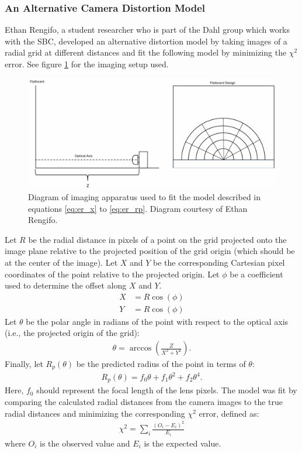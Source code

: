 \documentclass[11pt, letterpaper]{extarticle} %
\begin{document}
\subsubsection{An Alternative Camera Distortion Model}\label{subsubsec:an_alternative_distortion_model}
Ethan Rengifo, a student researcher who is part of the Dahl group which works with the SBC, developed an alternative distortion model by taking images of a radial grid at different distances and fit the following model by minimizing the $\chi^2$ error. See figure \ref{fig:er_distortion_apparatus} for the imaging setup used. 

\begin{figure}[h]
    \centering
    \includegraphics[width=0.75\linewidth]{er_distortion_apparatus.png}
    \caption{Diagram of imaging apparatus used to fit the model described in equations \ref{eq:er_x} to \ref{eq:er_rp}. Diagram courtesy of Ethan Rengifo.}
    \label{fig:er_distortion_apparatus}
\end{figure}

Let $R$ be the radial distance in pixels of a point on the grid projected onto the image plane relative to the projected position of the grid origin (which should be at the center of the image). Let $X$ and $Y$ be the corresponding Cartesian pixel coordinates of the point relative to the projected origin. Let $\phi$ be a coefficient used to determine the offset along $X$ and $Y$.
\begin{align}
    \label{eq:er_x} X &= R \cos(\phi)\\
    \label{eq:er_y} Y &= R \cos(\phi)
\end{align}
Let $\theta$ be the polar angle in radians of the point with respect to the optical axis (i.e., the projected origin of the grid):
\begin{align}
    \label{eq:er_theta} \theta = \arccos\left( \frac{Z}{X^2 + Y^2} \right).
\end{align}
Finally, let $R_p(\theta)$ be the predicted radius of the point in terms of $\theta$:
\begin{align}
    \label{eq:er_rp} R_p (\theta) = f_0 \theta + f_1 \theta^2 + f_2 \theta^4.
\end{align}
Here, $f_0$ should represent the focal length of the lens pixels. The model was fit by comparing the calculated radial distances from the camera images to the true radial distances and minimizing the corresponding $\chi^2$ error, defined as:
\begin{align}
    \chi^2 = \sum_i \frac{(O_i - E_i)^2}{E_i}
\end{align}
where $O_i$ is the observed value and $E_i$ is the expected value.
\end{document}
